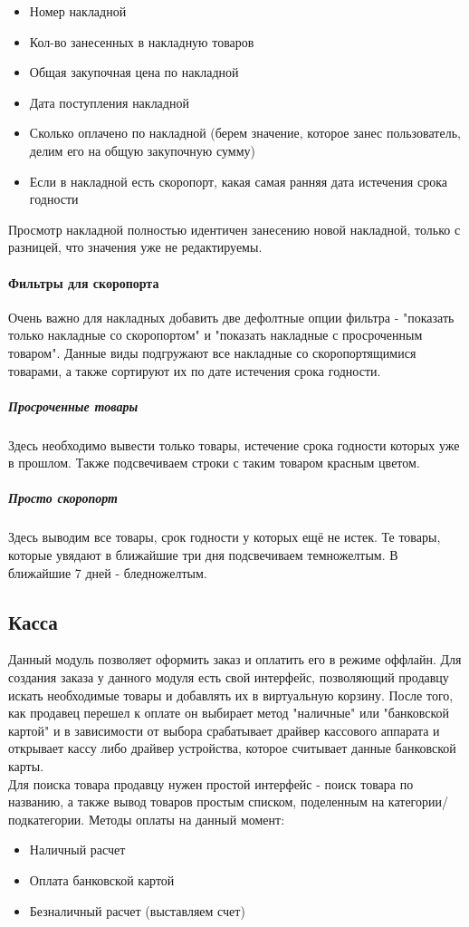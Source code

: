 \documentclass[DIV=calc, paper=a4, fontsize=11pt]{scrartcl} %
\begin{document}
\begin{itemize}
	\item Номер накладной
	\item Кол-во занесенных в накладную товаров
	\item Общая закупочная цена по накладной
	\item Дата поступления накладной
	\item Сколько оплачено по накладной (берем значение, которое занес пользователь, делим его на общую закупочную сумму)
	\item Если в накладной есть скоропорт, какая самая ранняя дата истечения срока годности
\end{itemize}

Просмотр накладной полностью идентичен занесению новой накладной, только с разницей, что значения уже не редактируемы.

\paragraph{Фильтры для скоропорта}
Очень важно для накладных добавить две дефолтные опции фильтра - "показать только накладные со скоропортом" и "показать накладные с просроченным товаром". Данные виды подгружают все накладные со скоропортящимися товарами, а также сортируют их по дате истечения срока годности. 

\subparagraph{Просроченные товары}
Здесь необходимо вывести только товары, истечение срока годности которых уже в прошлом. Также подсвечиваем строки с таким товаром красным цветом.

\subparagraph{Просто скоропорт}
Здесь выводим все товары, срок годности у которых ещё не истек. Те товары, которые увядают в ближайшие три дня подсвечиваем темножелтым. В ближайшие 7 дней - бледножелтым.

\subsection{Касса}

Данный модуль позволяет оформить заказ и оплатить его в режиме оффлайн. Для создания заказа у данного модуля есть свой интерфейс, позволяющий продавцу искать необходимые товары и добавлять их в виртуальную корзину. После того, как продавец перешел к оплате он выбирает метод "наличные" или "банковской картой" и в зависимости от выбора срабатывает драйвер кассового аппарата и открывает кассу либо драйвер устройства, которое считывает данные банковской карты.
\\[0.5cm]
Для поиска товара продавцу нужен простой интерфейс - поиск товара по названию, а также вывод товаров простым списком, поделенным на категории/подкатегории. Методы оплаты на данный момент:
\begin{itemize}
	\item Наличный расчет
	\item Оплата банковской картой
	\item Безналичный расчет (выставляем счет)
\end{itemize}
\end{document}
